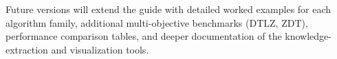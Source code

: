 \documentclass[a4paper,11pt]{article}
\begin{document}
Future versions will extend the guide with detailed worked examples for each
algorithm family, additional multi-objective benchmarks (DTLZ, ZDT),
performance comparison tables, and deeper documentation of the knowledge-
extraction and visualization tools.



\end{document}
